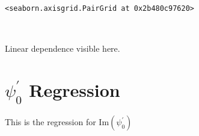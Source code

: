 \documentclass[11pt]{article}
\makeatletter
\newcommand{\boxspacing}{\kern\kvtcb@left@rule\kern\kvtcb@boxsep}
\newcommand{\prompt}[4]{
        {\ttfamily\llap{{\color{#2}[#3]:\hspace{3pt}#4}}\vspace{-\baselineskip}}
    }
\makeatother
\begin{document}
            \begin{tcolorbox}[breakable, size=fbox, boxrule=.5pt, pad at break*=1mm, opacityfill=0]
\prompt{Out}{outcolor}{43}{\boxspacing}
\begin{Verbatim}[commandchars=\\\{\}]
<seaborn.axisgrid.PairGrid at 0x2b480c97620>
\end{Verbatim}
\end{tcolorbox}
        
    \begin{center}
    \end{center}
    { \hspace*{\fill} \\}
    
    Linear dependence visible here.

    \hypertarget{psiprime_0-regression}{%
\section{\texorpdfstring{\(\psi^\prime_0\)
Regression}{\textbackslash psi\^{}\textbackslash prime\_0 Regression}}\label{psiprime_0-regression}}

    This is the regression for \(\mathrm{Im}(\psi_0^\prime)\)
\end{document}
